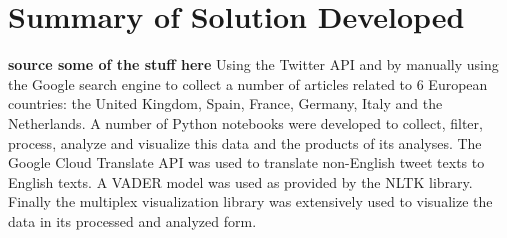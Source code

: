 %
%

\section{Summary of Solution Developed}
\textbf{source some of the stuff here}
Using the Twitter \ac{API} and by manually using the Google search engine to collect a number of articles related to 6 European countries: the United Kingdom, Spain, France, Germany, Italy and the Netherlands.
A number of Python notebooks were developed to collect, filter, process, analyze and visualize this data and the products of its analyses.
The Google Cloud Translate \ac{API} was used to translate non-English tweet texts to English texts.
A \ac{VADER} model was used as provided by the \ac{NLTK} library.
Finally the multiplex visualization library was extensively used to visualize the data in its processed and analyzed form.

%
%


%
%


